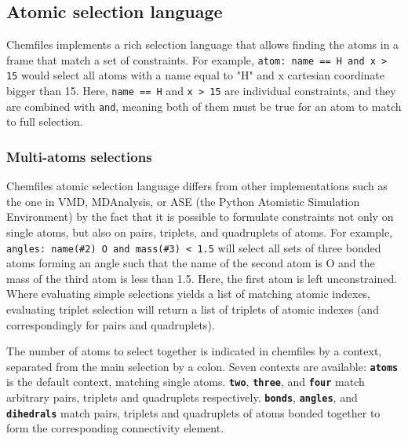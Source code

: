 \documentclass[thesis]{subfiles}
\begin{document}
\subsection{Atomic selection language}
\label{sec:chemfiles:selections}
\newcommand{\token}[1]{\texttt{\bfseries#1}}

Chemfiles implements a rich selection language that allows finding the atoms in a
frame that match a set of constraints. For example, \texttt{atom: name == H and x
> 15} would select all atoms with a name equal to "H" and x cartesian coordinate
bigger than 15. Here, \texttt{name == H} and \texttt{x > 15} are individual
constraints, and they are combined with \texttt{and}, meaning both of them must
be true for an atom to match to full selection.

\subsubsection{Multi-atoms selections}

Chemfiles atomic selection language differs from other implementations such as
the one in VMD, MDAnalysis, or ASE (the Python Atomistic Simulation Environment)
by the fact that it is possible to formulate constraints not only on single
atoms, but also on pairs, triplets, and quadruplets of atoms. For example,
\texttt{angles: name(\#2) O and mass(\#3) < 1.5} will select all sets of three
bonded atoms forming an angle such that the name of the second atom is O and the
mass of the third atom is less than 1.5. Here, the first atom is left
unconstrained. Where evaluating simple selections yields a list of matching
atomic indexes, evaluating triplet selection will return a list of triplets of
atomic indexes (and correspondingly for pairs and quadruplets).

The number of atoms to select together is indicated in chemfiles by a context,
separated from the main selection by a colon. Seven contexts are available:
\token{atoms} is the default context, matching single atoms. \token{two},
\token{three}, and \token{four} match arbitrary pairs, triplets and quadruplets
respectively. \token{bonds}, \token{angles}, and \token{dihedrals} match pairs,
triplets and quadruplets of atoms bonded together to form the corresponding
connectivity element.
\end{document}
